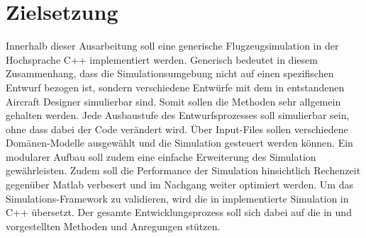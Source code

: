 \section{Zielsetzung}
Innerhalb dieser Ausarbeitung soll eine generische Flugzeugsimulation in der Hochsprache C++ implementiert werden. Generisch bedeutet in diesem Zusammenhang, dass die Simulationsumgebung nicht auf einen spezifischen Entwurf bezogen ist, sondern verschiedene Entwürfe mit dem in \cite{Olucak.15.02.2017} entstandenen Aircraft Designer simulierbar sind. Somit sollen die Methoden sehr allgemein gehalten werden.  Jede Ausbaustufe des Entwurfsprozesses soll simulierbar sein, ohne dass dabei der Code verändert wird. Über Input-Files sollen verschiedene Domänen-Modelle ausgewählt und die Simulation gesteuert werden können.  Ein modularer Aufbau soll zudem eine einfache Erweiterung des Simulation gewährleisten. Zudem soll die Performance der Simulation hinsichtlich Rechenzeit gegenüber Matlab verbesert und im Nachgang weiter optimiert werden. Um das Simulations-Framework zu validieren, wird die in \cite{Olucak.15.02.2017} implementierte Simulation in C++ übersetzt. Der gesamte Entwicklungsprozess soll sich dabei auf die in \cite{Kessler.Sommersemester2017} und \cite{Kessler.Wintersemester201718} vorgestellten Methoden und Anregungen stützen.
 
